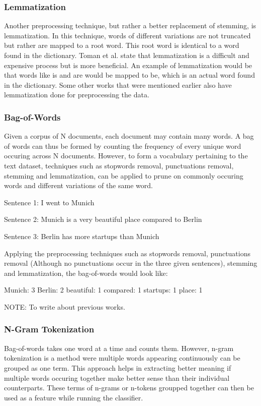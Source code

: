 \documentclass[a4paper,12pt,twoside]{report}
\begin{document}
\subsubsection{Lemmatization}
Another preprocessing technique, but rather a better replacement of stemming, is lemmatization. In this technique, words of different variations are not truncated but rather are mapped to a root word. This root word is identical to a word found in the dictionary. Toman et al. state that lemmatization is a difficult and expensive process but is more beneficial. An example of lemmatization would be that words like is and are would be mapped to be, which is an actual word found in the dictionary. Some other works that were mentioned earlier also have lemmatization done for preprocessing the data. 

\subsubsection{Bag-of-Words}
Given a corpus of N documents, each document may contain many words. A bag of words can thus be formed by counting the frequency of every unique word occuring across N documents. However, to form a vocabulary pertaining to the text dataset, techniques such as stopwords removal, punctuations removal, stemming and lemmatization, can be applied to prune on commonly occuring words and different variations of the same word.

Sentence 1: I went to Munich

Sentence 2: Munich is a very beautiful place compared to Berlin

Sentence 3: Berlin has more startups than Munich

Applying the preprocessing techniques such as stopwords removal, punctuations removal (Although no punctuations occur in the three given sentences), stemming and lemmatization, the bag-of-words would look like:

Munich: 3
Berlin: 2
beautiful: 1
compared: 1
startups: 1
place: 1

NOTE: To write about previous works. 

\subsubsection{N-Gram Tokenization}
Bag-of-words takes one word at a time and counts them. However, n-gram tokenization is a method were multiple words appearing continuously can be grouped as one term. This approach helps in extracting better meaning if multiple words occuring together make better sense than their individual counterparts. These terms of n-grams or n-tokens groupped together can then be used as a feature while running the classifier. 
\end{document}
